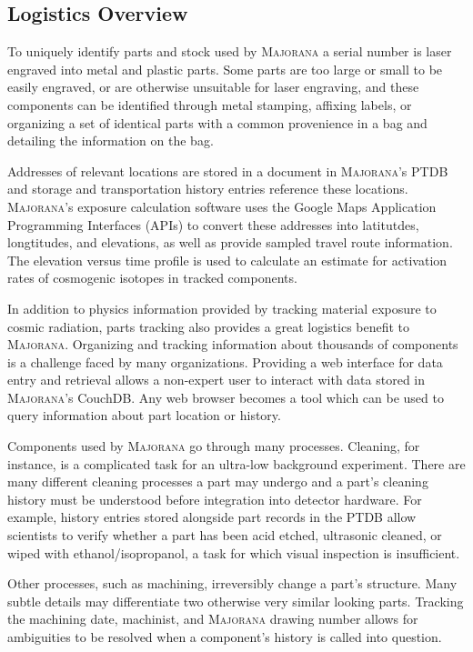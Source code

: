 \documentclass[journal]{IEEEtran}
\begin{document}
\subsection{Logistics Overview}

To uniquely identify parts and stock used by \textsc{Majorana} a serial number is laser engraved into metal and plastic parts.
Some parts are too large or small to be easily engraved, or are otherwise unsuitable for laser engraving, and these
components can be identified through metal stamping, affixing labels, or organizing a set of identical parts
with a common provenience in a bag and detailing the information on the bag.

Addresses of relevant locations are stored in a document in \textsc{Majorana}'s PTDB and storage and transportation history
entries reference these locations. \textsc{Majorana}'s exposure calculation software uses the 
Google Maps Application Programming Interfaces (APIs) \cite{google_maps_dev_guide} to convert these addresses into latitutdes, longtitudes, and elevations,
as well as provide sampled travel route information. The elevation versus time
profile is used to calculate an estimate for activation rates of cosmogenic isotopes in tracked components.

In addition to physics information provided by tracking material exposure to cosmic radiation, parts tracking also provides
a great logistics benefit to \textsc{Majorana}. Organizing and tracking information about thousands of components is a
challenge faced by many organizations. Providing a web interface for data entry and retrieval allows
a non-expert user to interact with data stored in \textsc{Majorana}'s CouchDB. Any web browser becomes a tool which can
be used to query information about part location or history.

Components used by \textsc{Majorana} go through many processes. Cleaning, for instance, is a complicated task for an ultra-low
background experiment. There are many different cleaning processes a part may undergo and a part's cleaning history
must be understood before integration into detector hardware. For example, history entries stored alongside part records in the PTDB
allow scientists to verify whether a part has been acid etched, ultrasonic cleaned, or wiped with ethanol/isopropanol,
a task for which visual inspection is insufficient.

Other processes, such as machining, irreversibly change a part's structure. Many subtle details may differentiate
two otherwise very similar looking parts. Tracking the machining date, machinist, and \textsc{Majorana} drawing number allows
for ambiguities to be resolved when a component's history is called into question. 
\end{document}
